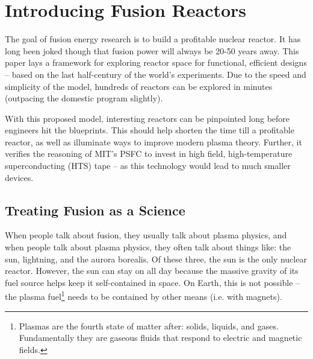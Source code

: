 %
%
%
%
%
%
%
%

\chapter{Introducing Fusion Reactors}

The goal of fusion energy research is to build a profitable nuclear reactor. It has long been joked though that fusion power will always be 20-50 years away. This paper lays a framework for exploring reactor space for functional, efficient designs -- based on the last half-century of the world's experiments. Due to the speed and simplicity of the model, hundreds of reactors can be explored in minutes (outpacing the domestic program slightly).

With this proposed model, interesting reactors can be pinpointed long before engineers hit the blueprints. This should help shorten the time till a profitable reactor, as well as illuminate ways to improve modern plasma theory. Further, it verifies the reasoning of MIT's PSFC to invest in high field, high-temperature superconducting (HTS) tape -- as this technology would lead to much smaller devices.

\section{Treating Fusion  as a Science}

When people talk about fusion, they usually talk about plasma physics, and when people talk about plasma physics, they often talk about things like: the sun, lightning, and the aurora borealis. Of these three, the sun is the only nuclear reactor. However, the sun can stay on all day because the massive gravity of its fuel source helps keep it self-contained in space. On Earth, this is not possible -- the plasma fuel\footnote{Plasmas are the fourth state of matter after: solids, liquids, and gases. Fundamentally they are gaseous fluids that respond to electric and magnetic fields.} needs to be contained by other means (i.e. with magnets).

